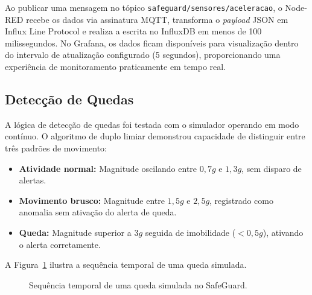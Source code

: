 \documentclass[a4paper,12pt]{article}
\begin{document}
Ao publicar uma mensagem no tópico \texttt{safeguard/sensores/aceleracao}, o Node-RED recebe os dados via assinatura MQTT, transforma o \textit{payload} JSON em Influx Line Protocol e realiza a escrita no InfluxDB em menos de 100 milissegundos. No Grafana, os dados ficam disponíveis para visualização dentro do intervalo de atualização configurado (5 segundos), proporcionando uma experiência de monitoramento praticamente em tempo real.

\subsection{Detecção de Quedas}

A lógica de detecção de quedas foi testada com o simulador operando em modo contínuo. O algoritmo de duplo limiar demonstrou capacidade de distinguir entre três padrões de movimento:

\begin{itemize}[leftmargin=2cm]
    \item \textbf{Atividade normal:} Magnitude oscilando entre $0{,}7g$ e $1{,}3g$, sem disparo de alertas.
    \item \textbf{Movimento brusco:} Magnitude entre $1{,}5g$ e $2{,}5g$, registrado como anomalia sem ativação do alerta de queda.
    \item \textbf{Queda:} Magnitude superior a $3g$ seguida de imobilidade ($< 0{,}5g$), ativando o alerta corretamente.
\end{itemize}

A Figura~\ref{fig:sequencia-quedaa} ilustra a sequência temporal de uma queda simulada.

\begin{figure}[H]
\centering
{}
\caption{Sequência temporal de uma queda simulada no SafeGuard.}
\label{fig:sequencia-quedaa}
\end{figure}
\end{document}

